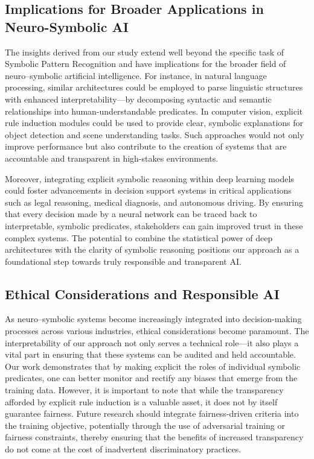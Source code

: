 \documentclass{article}
\begin{document}
\subsection*{Implications for Broader Applications in Neuro-Symbolic AI}
The insights derived from our study extend well beyond the specific task of Symbolic Pattern Recognition and have implications for the broader field of neuro–symbolic artificial intelligence. For instance, in natural language processing, similar architectures could be employed to parse linguistic structures with enhanced interpretability—by decomposing syntactic and semantic relationships into human-understandable predicates. In computer vision, explicit rule induction modules could be used to provide clear, symbolic explanations for object detection and scene understanding tasks. Such approaches would not only improve performance but also contribute to the creation of systems that are accountable and transparent in high-stakes environments.

Moreover, integrating explicit symbolic reasoning within deep learning models could foster advancements in decision support systems in critical applications such as legal reasoning, medical diagnosis, and autonomous driving. By ensuring that every decision made by a neural network can be traced back to interpretable, symbolic predicates, stakeholders can gain improved trust in these complex systems. The potential to combine the statistical power of deep architectures with the clarity of symbolic reasoning positions our approach as a foundational step towards truly responsible and transparent AI.

\subsection*{Ethical Considerations and Responsible AI}
As neuro–symbolic systems become increasingly integrated into decision-making processes across various industries, ethical considerations become paramount. The interpretability of our approach not only serves a technical role—it also plays a vital part in ensuring that these systems can be audited and held accountable. Our work demonstrates that by making explicit the roles of individual symbolic predicates, one can better monitor and rectify any biases that emerge from the training data. However, it is important to note that while the transparency afforded by explicit rule induction is a valuable asset, it does not by itself guarantee fairness. Future research should integrate fairness-driven criteria into the training objective, potentially through the use of adversarial training or fairness constraints, thereby ensuring that the benefits of increased transparency do not come at the cost of inadvertent discriminatory practices.
\end{document}
